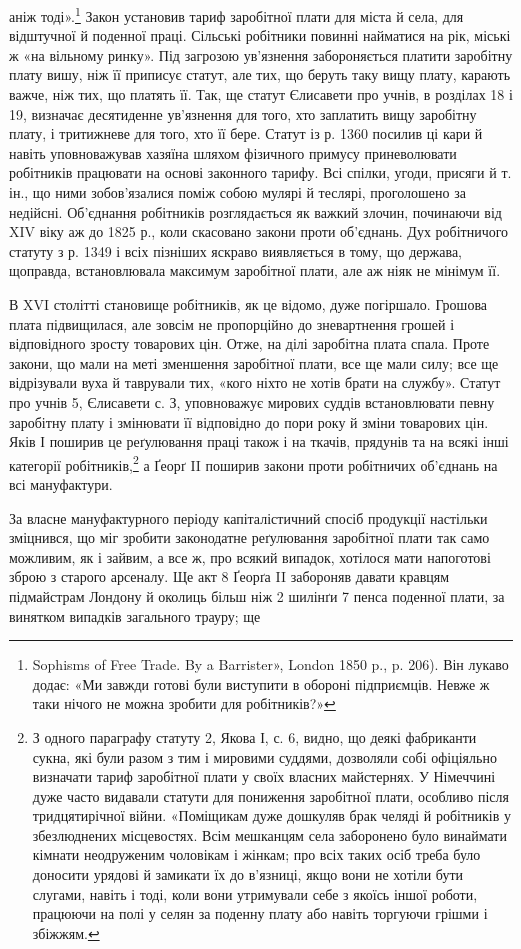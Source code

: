 аніж тоді».\footnote{
Sophisms of Free Trade. By a Barrister», London 1850 p., p. 206).
Він лукаво додає: «Ми завжди готові були виступити в обороні підприємців.
Невже ж таки нічого не можна зробити для робітників?»
} Закон установив тариф заробітної плати для міста
й села, для відштучної й поденної праці. Сільські робітники
повинні найматися на рік, міські ж «на вільному ринку». Під
загрозою ув’язнення забороняється платити заробітну плату
вишу, ніж її приписує статут, але тих, що беруть таку вищу
плату, карають важче, ніж тих, що платять її. Так, ще статут
Єлисавети про учнів, в розділах 18 і 19, визначає десятиденне
ув’язнення для того, хто заплатить вищу заробітну плату, і
тритижневе для того, хто її бере. Статут із р. 1360 посилив ці
кари й навіть уповноважував хазяїна шляхом фізичного примусу
приневолювати робітників працювати на основі законного тарифу.
Всі спілки, угоди, присяги й т. ін., що ними зобов’язалися поміж
собою мулярі й теслярі, проголошено за недійсні. Об’єднання
робітників розглядається як важкий злочин, починаючи від
XIV віку аж до 1825 р., коли скасовано закони проти об’єднань.
Дух робітничого статуту з р. 1349 і всіх пізніших яскраво виявляється
в тому, що держава, щоправда, встановлювала максимум
заробітної плати, але аж ніяк не мінімум її.

В XVI столітті становище робітників, як це відомо, дуже
погіршало. Грошова плата підвищилася, але зовсім не пропорційно
до зневартнення грошей і відповідного зросту товарових цін.
Отже, на ділі заробітна плата спала. Проте закони, що мали на
меті зменшення заробітної плати, все ще мали силу; все ще відрізували
вуха й таврували тих, «кого ніхто не хотів брати на
службу». Статут про учнів 5, Єлисавети с. З, уповноважує мирових
суддів встановлювати певну заробітну плату і змінювати
її відповідно до пори року й зміни товарових цін. Яків І поширив
це реґулювання праці також і на ткачів, прядунів та на всякі
інші категорії робітників,\footnote{
З одного параграфу статуту 2, Якова І, с. 6, видно, що деякі
фабриканти сукна, які були разом з тим і мировими суддями, дозволяли
собі офіціяльно визначати тариф заробітної плати у своїх власних майстернях.
У Німеччині дуже часто видавали статути для пониження
заробітної плати, особливо після тридцятирічної війни. «Поміщикам
дуже дошкуляв брак челяді й робітників у збезлюднених місцевостях.
Всім мешканцям села заборонено було винаймати кімнати неодруженим
чоловікам і жінкам; про всіх таких осіб треба було доносити урядові
й замикати їх до в’язниці, якщо вони не хотіли бути слугами, навіть
і тоді, коли вони утримували себе з якоїсь іншої роботи, працюючи на
полі у селян за поденну плату або навіть торгуючи грішми і збіжжям.
} а Ґеорґ II поширив закони проти
робітничих об’єднань на всі мануфактури.

За власне мануфактурного періоду капіталістичний спосіб
продукції настільки зміцнився, що міг зробити законодатне
реґулювання заробітної плати так само можливим, як і зайвим,
а все ж, про всякий випадок, хотілося мати напоготові зброю
з старого арсеналу. Ще акт 8 Ґеорґа II забороняв давати кравцям
підмайстрам Лондону й околиць більш ніж 2 шилінґи 7 пенса
поденної плати, за винятком випадків загального трауру; ще